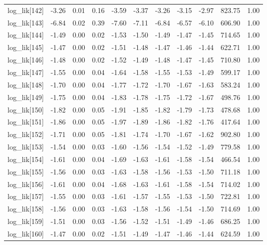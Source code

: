\begin{table}[ht]
\begin{tabular}{rrrrrrrrrrr}
  log\_lik[142] & -3.26 & 0.01 & 0.16 & -3.59 & -3.37 & -3.26 & -3.15 & -2.97 & 823.75 & 1.00 \\ 
  log\_lik[143] & -6.84 & 0.02 & 0.39 & -7.60 & -7.11 & -6.84 & -6.57 & -6.10 & 606.90 & 1.00 \\ 
  log\_lik[144] & -1.49 & 0.00 & 0.02 & -1.53 & -1.50 & -1.49 & -1.47 & -1.45 & 714.65 & 1.00 \\ 
  log\_lik[145] & -1.47 & 0.00 & 0.02 & -1.51 & -1.48 & -1.47 & -1.46 & -1.44 & 622.71 & 1.00 \\ 
  log\_lik[146] & -1.48 & 0.00 & 0.02 & -1.52 & -1.49 & -1.48 & -1.47 & -1.45 & 710.80 & 1.00 \\ 
  log\_lik[147] & -1.55 & 0.00 & 0.04 & -1.64 & -1.58 & -1.55 & -1.53 & -1.49 & 599.17 & 1.00 \\ 
  log\_lik[148] & -1.70 & 0.00 & 0.04 & -1.77 & -1.72 & -1.70 & -1.67 & -1.63 & 583.24 & 1.00 \\ 
  log\_lik[149] & -1.75 & 0.00 & 0.04 & -1.83 & -1.78 & -1.75 & -1.72 & -1.67 & 498.76 & 1.00 \\ 
  log\_lik[150] & -1.82 & 0.00 & 0.05 & -1.91 & -1.85 & -1.82 & -1.79 & -1.73 & 478.68 & 1.00 \\ 
  log\_lik[151] & -1.86 & 0.00 & 0.05 & -1.97 & -1.89 & -1.86 & -1.82 & -1.76 & 417.64 & 1.00 \\ 
  log\_lik[152] & -1.71 & 0.00 & 0.05 & -1.81 & -1.74 & -1.70 & -1.67 & -1.62 & 902.80 & 1.00 \\ 
  log\_lik[153] & -1.54 & 0.00 & 0.03 & -1.60 & -1.56 & -1.54 & -1.52 & -1.49 & 779.58 & 1.00 \\ 
  log\_lik[154] & -1.61 & 0.00 & 0.04 & -1.69 & -1.63 & -1.61 & -1.58 & -1.54 & 466.54 & 1.00 \\ 
  log\_lik[155] & -1.56 & 0.00 & 0.03 & -1.63 & -1.58 & -1.56 & -1.53 & -1.50 & 711.18 & 1.00 \\ 
  log\_lik[156] & -1.61 & 0.00 & 0.04 & -1.68 & -1.63 & -1.61 & -1.58 & -1.54 & 714.02 & 1.00 \\ 
  log\_lik[157] & -1.55 & 0.00 & 0.03 & -1.61 & -1.57 & -1.55 & -1.53 & -1.50 & 722.81 & 1.00 \\ 
  log\_lik[158] & -1.56 & 0.00 & 0.03 & -1.63 & -1.58 & -1.56 & -1.54 & -1.50 & 714.69 & 1.00 \\ 
  log\_lik[159] & -1.51 & 0.00 & 0.03 & -1.56 & -1.52 & -1.51 & -1.49 & -1.46 & 686.25 & 1.00 \\ 
  log\_lik[160] & -1.47 & 0.00 & 0.02 & -1.51 & -1.49 & -1.47 & -1.46 & -1.44 & 624.59 & 1.00 \\ 

\end{tabular}
\end{table}
